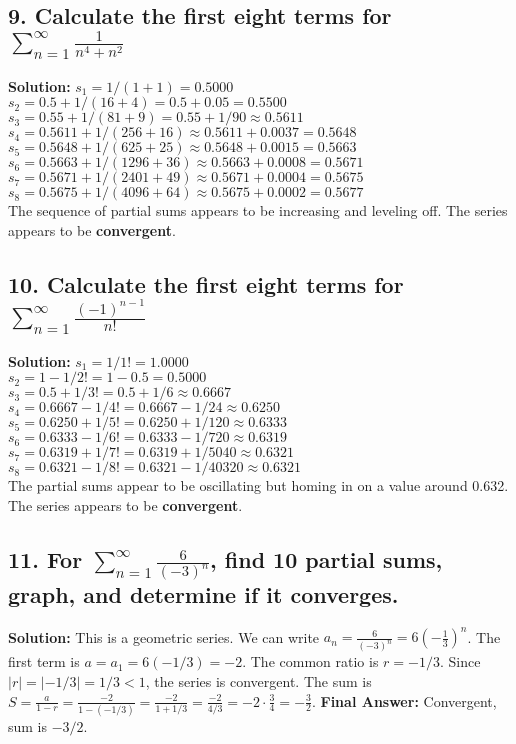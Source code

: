 \documentclass{article}
\begin{document}
\subsection*{9. Calculate the first eight terms for $\sum_{n=1}^{\infty} \frac{1}{n^4+n^2}$}
\textbf{Solution:}
$s_1 = 1/(1+1) = 0.5000$ \\
$s_2 = 0.5 + 1/(16+4) = 0.5 + 0.05 = 0.5500$ \\
$s_3 = 0.55 + 1/(81+9) = 0.55 + 1/90 \approx 0.5611$ \\
$s_4 = 0.5611 + 1/(256+16) \approx 0.5611 + 0.0037 = 0.5648$ \\
$s_5 = 0.5648 + 1/(625+25) \approx 0.5648 + 0.0015 = 0.5663$ \\
$s_6 = 0.5663 + 1/(1296+36) \approx 0.5663 + 0.0008 = 0.5671$ \\
$s_7 = 0.5671 + 1/(2401+49) \approx 0.5671 + 0.0004 = 0.5675$ \\
$s_8 = 0.5675 + 1/(4096+64) \approx 0.5675 + 0.0002 = 0.5677$ \\
The sequence of partial sums appears to be increasing and leveling off. The series appears to be \textbf{convergent}.

\subsection*{10. Calculate the first eight terms for $\sum_{n=1}^{\infty} \frac{(-1)^{n-1}}{n!}$}
\textbf{Solution:}
$s_1 = 1/1! = 1.0000$ \\
$s_2 = 1 - 1/2! = 1 - 0.5 = 0.5000$ \\
$s_3 = 0.5 + 1/3! = 0.5 + 1/6 \approx 0.6667$ \\
$s_4 = 0.6667 - 1/4! = 0.6667 - 1/24 \approx 0.6250$ \\
$s_5 = 0.6250 + 1/5! = 0.6250 + 1/120 \approx 0.6333$ \\
$s_6 = 0.6333 - 1/6! = 0.6333 - 1/720 \approx 0.6319$ \\
$s_7 = 0.6319 + 1/7! = 0.6319 + 1/5040 \approx 0.6321$ \\
$s_8 = 0.6321 - 1/8! = 0.6321 - 1/40320 \approx 0.6321$ \\
The partial sums appear to be oscillating but homing in on a value around 0.632. The series appears to be \textbf{convergent}.

\subsection*{11. For $\sum_{n=1}^{\infty} \frac{6}{(-3)^n}$, find 10 partial sums, graph, and determine if it converges.}
\textbf{Solution:}
This is a geometric series. We can write $a_n = \frac{6}{(-3)^n} = 6 \left(-\frac{1}{3}\right)^n$.
The first term is $a = a_1 = 6(-1/3) = -2$. The common ratio is $r = -1/3$.
Since $|r| = |-1/3| = 1/3 < 1$, the series is convergent.
The sum is $S = \frac{a}{1-r} = \frac{-2}{1 - (-1/3)} = \frac{-2}{1 + 1/3} = \frac{-2}{4/3} = -2 \cdot \frac{3}{4} = -\frac{3}{2}$.
\textbf{Final Answer:} Convergent, sum is $-3/2$.
\end{document}
